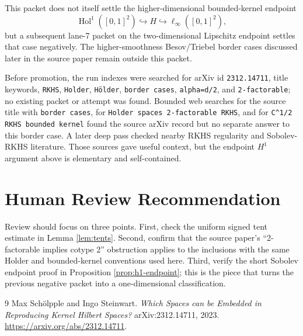 \documentclass[11pt]{article}
\newcommand{\Hol}{\operatorname{Hol}}
\newcommand{\linf}{\ell_\infty}
\begin{document}
This packet does not itself settle the higher-dimensional bounded-kernel
endpoint
\[
  \Hol^1([0,1]^2)\hookrightarrow H\hookrightarrow\linf([0,1]^2),
\]
but a subsequent lane-7 packet on the two-dimensional Lipschitz endpoint
settles that case negatively. The higher-smoothness Besov/Triebel border cases
discussed later in the source paper remain outside this packet.

Before promotion, the run indexes were searched for arXiv id
\texttt{2312.14711}, title keywords, \texttt{RKHS}, \texttt{Holder},
\texttt{H\"older}, \texttt{border cases}, \texttt{alpha=d/2}, and
\texttt{2-factorable}; no existing packet or attempt was found. Bounded web
searches for the source title with \texttt{border cases}, for
\texttt{Holder spaces 2-factorable RKHS}, and for
\texttt{C\string^{1/2} RKHS bounded kernel} found the source arXiv record but
no separate answer to this border case. A later deep pass checked nearby RKHS
regularity and Sobolev-RKHS literature. Those sources gave useful context, but
the endpoint \(H^1\) argument above is elementary and self-contained.

\section*{Human Review Recommendation}

Review should focus on three points. First, check the uniform signed tent
estimate in Lemma \ref{lem:tents}. Second, confirm that the source paper's
``2-factorable implies cotype 2'' obstruction applies to the inclusions with
the same Holder and bounded-kernel conventions used here. Third, verify the
short Sobolev endpoint proof in Proposition \ref{prop:h1-endpoint}; this is
the piece that turns the previous negative packet into a one-dimensional
classification.

\begin{thebibliography}{9}
Max Sch\"olpple and Ingo Steinwart.
\newblock \emph{Which Spaces can be Embedded in Reproducing Kernel Hilbert Spaces?}
\newblock arXiv:2312.14711, 2023.
\newblock \url{https://arxiv.org/abs/2312.14711}.
\end{thebibliography}
\end{document}
